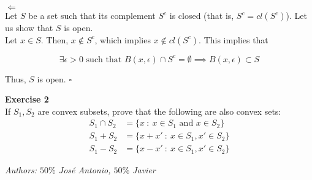 \documentclass[11pt,table]{article}
\newcommand{\qed}{\hfill $\square$}
\newenvironment{problem}[2][Exercise]
{ \begin{mdframed}[backgroundcolor=gray!20] \textbf{#1 #2} \\}
	{\hspace{0.0cm}\newline\newline \emph{Authors: \(50\%\) José Antonio, \(50\%\) Javier}  \end{mdframed}}
\begin{document}
	\(\boxed{\Leftarrow}\)\\
	
	Let \(S\) be a set such that its complement $S^c$ is closed (that is, \(S^c = cl(S^c)\)). Let us show that \(S\) is open. \\
	
	Let \(x \in S\). Then, \(x \notin S^c\), which implies \(x \notin cl(S^c)\). This implies that
	
	\[
	\exists \epsilon > 0 \text{ such that } B(x,\epsilon) \cap S^c = \emptyset \implies B(x,\epsilon) \subset S
	\]
	
	Thus, $S$ is open. \qed \\
	
	\begin{problem}{2}
		If \( S_1, S_2 \) are convex subsets, prove that the following are also convex sets:
		\begin{align*}
			S_{1} \cap S_{2} & = \{x \ : \ x \in S_{1} \text{ and } x \in S_{2}\} \\
			S_{1} + S_{2}    & = \{x + x' \ : \ x \in S_{1}, x' \in S_{2}\}       \\
			S_{1} - S_{2}    & = \{x - x' \ : \ x \in S_{1}, x' \in S_{2}\}
		\end{align*}
		
	\end{problem}
	
\end{document}
